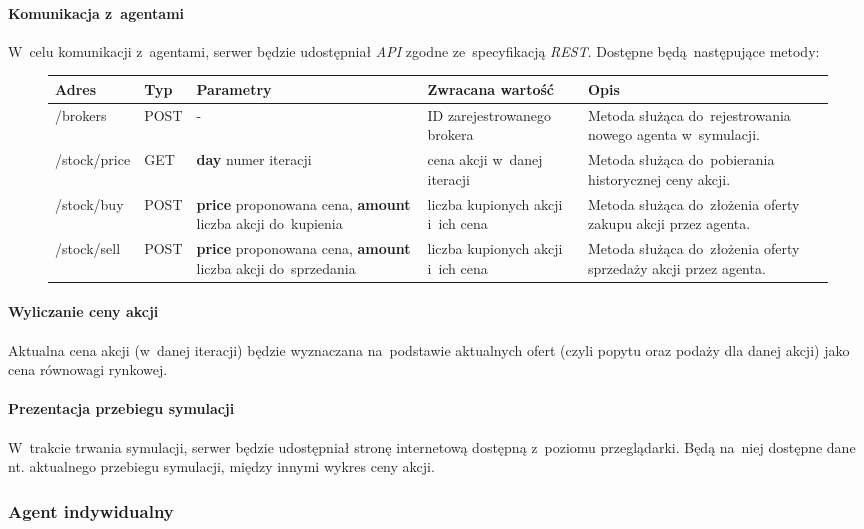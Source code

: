 \documentclass[11pt,a4paper]{article}
\begin{document}
\paragraph{Komunikacja z~agentami}
W~celu komunikacji z~agentami, serwer będzie udostępniał \textit{API} zgodne ze~specyfikacją \textit{REST}. Dostępne będą następujące metody:
\begin{figure}[H]
  \begin{tabularx}{\textwidth}{ |p{2cm}|p{1cm}|p{5cm}|p{2.5cm}|X| }
    \hline \textbf{Adres} & \textbf{Typ} & \textbf{Parametry} & \textbf{Zwracana wartość} & \textbf{Opis} \\ \hline
    /brokers & POST & - & ID zarejestrowanego brokera & Metoda służąca do~rejestrowania nowego agenta w~symulacji. \\ \hline
    /stock/price & GET & \textbf{day} numer iteracji & cena akcji w~danej iteracji & Metoda służąca do~pobierania historycznej ceny akcji. \\ \hline
    /stock/buy & POST & \textbf{price} proponowana cena, \textbf{amount} liczba akcji do~kupienia & liczba kupionych akcji i~ich cena & Metoda służąca do~złożenia oferty zakupu akcji przez agenta. \\ \hline
    /stock/sell & POST & \textbf{price} proponowana cena, \textbf{amount} liczba akcji do~sprzedania & liczba kupionych akcji i~ich cena & Metoda służąca do~złożenia oferty sprzedaży akcji przez agenta. \\ \hline
  \end{tabularx}
\end{figure}

\paragraph{Wyliczanie ceny akcji}
Aktualna cena akcji (w~danej iteracji) będzie wyznaczana na~podstawie aktualnych ofert (czyli popytu oraz podaży dla danej akcji) jako cena równowagi rynkowej.

\paragraph{Prezentacja przebiegu symulacji}
W~trakcie trwania symulacji, serwer będzie udostępniał stronę internetową dostępną z~poziomu przeglądarki. Będą na~niej dostępne dane nt. aktualnego przebiegu symulacji, między innymi wykres ceny akcji.

\subsubsection{Agent indywidualny}
\end{document}
